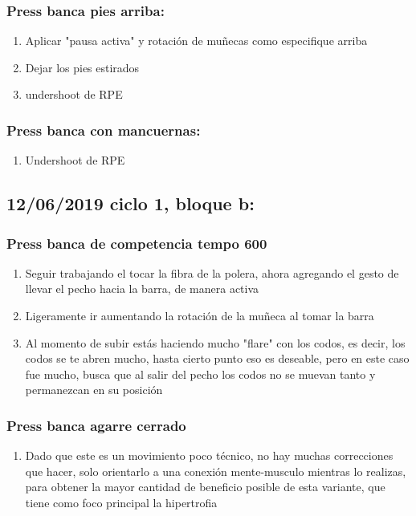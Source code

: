 \documentclass[11pt]{article}
\begin{document}
\subsubsection{Press banca pies arriba:}
\label{sec:org2be0751}

\begin{enumerate}
\item Aplicar "pausa activa" y rotación de muñecas como especifique
arriba
\item Dejar los pies estirados
\item undershoot de RPE
\end{enumerate}

\subsubsection{Press banca con mancuernas:}
\label{sec:org3a6d22a}

\begin{enumerate}
\item Undershoot de RPE
\end{enumerate}

\subsection{12/06/2019 ciclo 1, bloque b:}
\label{sec:org4b4343c}
\subsubsection{Press banca de competencia tempo 600}
\label{sec:org412b8fe}
\begin{enumerate}
\item Seguir trabajando el tocar la fibra de la polera, ahora agregando
el gesto de llevar el pecho hacia la barra, de manera activa
\item Ligeramente ir aumentando la rotación de la muñeca al tomar la
barra
\item Al momento de subir estás haciendo mucho "flare" con los codos, es
decir, los codos se te abren mucho, hasta cierto punto eso es
deseable, pero en este caso fue mucho, busca que al salir del pecho
los codos no se muevan tanto y permanezcan en su posición
\end{enumerate}
\subsubsection{Press banca agarre cerrado}
\label{sec:org9f1b24f}
\begin{enumerate}
\item Dado que este es un movimiento poco técnico, no hay muchas
correcciones que hacer, solo orientarlo a una conexión
mente-musculo mientras lo realizas, para obtener la mayor cantidad
de beneficio posible de esta variante, que tiene como foco
principal la hipertrofia
\end{enumerate}
\end{document}
